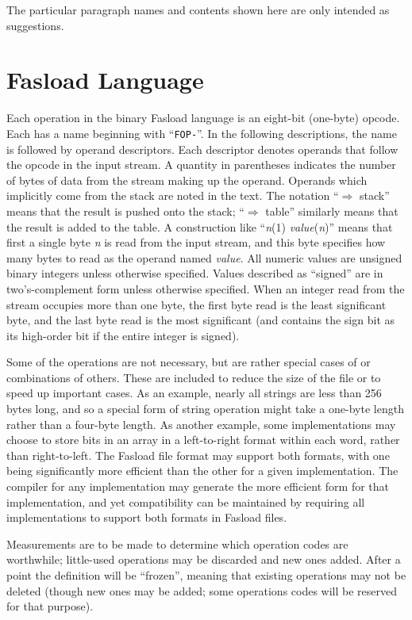 The particular paragraph names and contents shown here are only intended as
suggestions.

\section{Fasload Language}

Each operation in the binary Fasload language is an eight-bit
(one-byte) opcode.  Each has a name beginning with ``{\tt FOP-}''.  In	
the following descriptions, the name is followed by operand
descriptors.  Each descriptor denotes operands that follow the opcode
in the input stream.  A quantity in parentheses indicates the number
of bytes of data from the stream making up the operand.  Operands
which implicitly come from the stack are noted in the text.  The
notation ``$\Rightarrow$ stack'' means that the result is pushed onto the
stack; ``$\Rightarrow$ table'' similarly means that the result is added to the
table.  A construction like ``{\it n}(1) {\it value}({\it n})'' means that
first a single byte {\it n} is read from the input stream, and this
byte specifies how many bytes to read as the operand named {\it value}.
All numeric values are unsigned binary integers unless otherwise
specified.  Values described as ``signed'' are in two's-complement form
unless otherwise specified.  When an integer read from the stream
occupies more than one byte, the first byte read is the least
significant byte, and the last byte read is the most significant (and
contains the sign bit as its high-order bit if the entire integer is
signed).

Some of the operations are not necessary, but are rather special
cases of or combinations of others.  These are included to reduce the
size of the file or to speed up important cases.  As an example,
nearly all strings are less than 256 bytes long, and so a special
form of string operation might take a one-byte length rather than a
four-byte length.  As another example, some implementations may
choose to store bits in an array in a left-to-right format within
each word, rather than right-to-left.  The Fasload file format may
support both formats, with one being significantly more efficient
than the other for a given implementation.  The compiler for any
implementation may generate the more efficient form for that
implementation, and yet compatibility can be maintained by requiring
all implementations to support both formats in Fasload files.

Measurements are to be made to determine which operation codes are
worthwhile; little-used operations may be discarded and new ones
added.  After a point the definition will be ``frozen'', meaning that
existing operations may not be deleted (though new ones may be added;
some operations codes will be reserved for that purpose).

